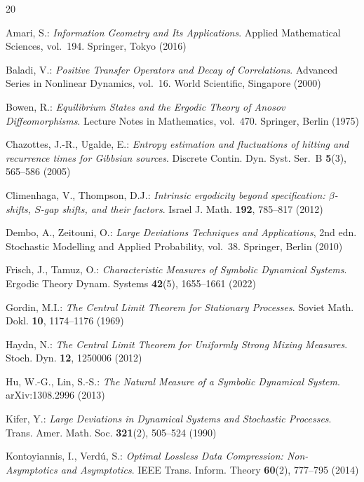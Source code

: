 \documentclass[pdflatex,sn-basic,Numbered]{sn-jnl}
\theoremstyle{thmstyleone}
\theoremstyle{thmstyletwo}
\theoremstyle{thmstylethree}
\begin{document}
\begin{thebibliography}{20}

Amari, S.:
\textit{Information Geometry and Its Applications}.
Applied Mathematical Sciences, vol.~194.
Springer, Tokyo (2016)

Baladi, V.:
\textit{Positive Transfer Operators and Decay of Correlations}.
Advanced Series in Nonlinear Dynamics, vol.~16.
World Scientific, Singapore (2000)

Bowen, R.:
\textit{Equilibrium States and the Ergodic Theory of Anosov Diffeomorphisms}.
Lecture Notes in Mathematics, vol.~470.
Springer, Berlin (1975)

Chazottes, J.-R., Ugalde, E.:
\textit{Entropy estimation and fluctuations of hitting and recurrence times for Gibbsian sources}.
Discrete Contin. Dyn. Syst. Ser.~B \textbf{5}(3), 565--586 (2005)

Climenhaga, V., Thompson, D.J.:
\textit{Intrinsic ergodicity beyond specification: $\beta$-shifts, $S$-gap shifts, and their factors}.
Israel J. Math. \textbf{192}, 785--817 (2012)

Dembo, A., Zeitouni, O.:
\textit{Large Deviations Techniques and Applications}, 2nd edn.
Stochastic Modelling and Applied Probability, vol.~38.
Springer, Berlin (2010)

Frisch, J., Tamuz, O.:
\textit{Characteristic Measures of Symbolic Dynamical Systems}.
Ergodic Theory Dynam. Systems \textbf{42}(5), 1655--1661 (2022)

Gordin, M.I.:
\textit{The Central Limit Theorem for Stationary Processes}.
Soviet Math. Dokl. \textbf{10}, 1174--1176 (1969)

Haydn, N.:
\textit{The Central Limit Theorem for Uniformly Strong Mixing Measures}.
Stoch. Dyn. \textbf{12}, 1250006 (2012)

Hu, W.-G., Lin, S.-S.:
\textit{The Natural Measure of a Symbolic Dynamical System}.
arXiv:1308.2996 (2013)

Kifer, Y.:
\textit{Large Deviations in Dynamical Systems and Stochastic Processes}.
Trans. Amer. Math. Soc. \textbf{321}(2), 505--524 (1990)

Kontoyiannis, I., Verd\'u, S.:
\textit{Optimal Lossless Data Compression: Non-Asymptotics and Asymptotics}.
IEEE Trans. Inform. Theory \textbf{60}(2), 777--795 (2014)


\end{thebibliography}
\end{document}
